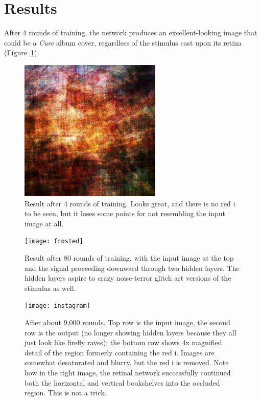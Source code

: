 \documentclass[twocolumn]{article}
\begin{document}
\section{Results}

After 4 rounds of training, the network produces an excellent-looking
image that could be a {\em Cure} album cover, regardless of the stimulus
cast upon its retina (Figure~\ref{fig:cure}).

\begin{figure}[bth]
\begin{center}
\includegraphics[width=0.65 \linewidth]{cure}
\end{center}
\caption{Result after 4 rounds of training. Looks great, and there is no
red i to be seen, but it loses some points for not resembling the
input image at all.} \label{fig:cure}
\end{figure}

\begin{figure}[htb]
\begin{center}
\texttt{[image: frosted]}
\end{center}
\caption{Result after 80 rounds of training, with the input image at the top
and the signal proceeding downward through two hidden layers. The hidden layers
aspire to crazy noise-terror glitch art versions of the stimulus as well.} \label{fig:frosted}
\end{figure}

\begin{figure}[htb]
\begin{center}
\texttt{[image: instagram]}
\end{center}
\caption{After about 9,000 rounds. Top row is the input image, the
second row is the output (no longer showing hidden layers because
they all just look like firefly raves); the bottom row shows 4x
magnified detail of the region formerly containing the red i.
Images are somewhat desaturated and blurry, but the red i is removed.
Note how in the right image, the retinal network successfully continued
both the horizontal and vertical bookshelves into the occluded region.
This is not a trick.} \label{fig:instagram}
\end{figure}
\end{document}
